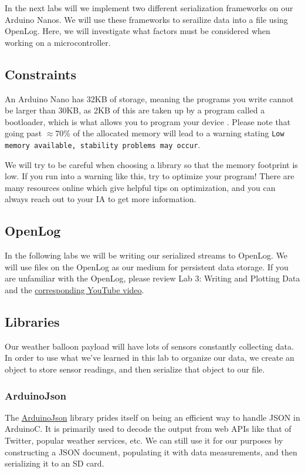 In the next labs will we implement two different serialization frameworks on our Arduino Nanos. We will use these frameworks to serailize data into a file using OpenLog. Here, we will investigate what factors must be considered when working on a microcontroller. 

\subsection{Constraints}
An Arduino Nano has 32KB of storage, meaning the programs you write cannot be larger than 30KB, as 2KB of this are taken up by a program called a bootloader, which is what allows you to program your device \cite{arduino_nano_specs}. Please note that going past $\approx 70$\% of the allocated memory will lead to a warning stating \texttt{Low memory available, stability problems may occur}. 

We will try to be careful when choosing a library so that the memory footprint is low. If you run into a warning like this, try to optimize your program! There are many resources online which give helpful tips on optimization, and you can always reach out to your IA to get more information. 

\subsection{OpenLog}
In the following labs we will be writing our serialized streams to OpenLog. We will use files on the OpenLog as our medium for persistent data storage. If you are unfamiliar with the OpenLog, please review Lab 3:  Writing and Plotting Data and the \href{https://www.youtube.com/watch?v=FhgAi-ju6Z4}{corresponding YouTube video}.

\subsection{Libraries}
Our weather balloon payload will have lots of sensors constantly collecting data. In order to use what we've learned in this lab to organize our data, we create an object to store sensor readings, and then serialize that object to our file.

\subsubsection{ArduinoJson}
The \href{https://arduinojson.org/}{ArduinoJson} library prides itself on being an efficient way to handle JSON in ArduinoC. It is primarily used to decode the output from web APIs like that of Twitter, popular weather services, etc. We can still use it for our purposes by constructing a JSON document, populating it with data measurements, and then serializing it to an SD card. 

